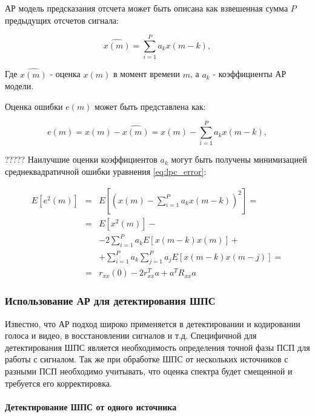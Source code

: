 АР модель предсказания отсчета может быть описана как взвешенная сумма ${P}$ предыдущих отсчетов сигнала:
\begin{center}
\begin{equation}
	\label{eq:lpc_forecast}
	\hat{x(m)} = \sum \limits_{i=1}^P a_k x(m-k),
\end{equation}
\end{center}
Где ${\hat{x(m)}}$ - оценка ${x(m)}$ в момент времени ${m}$, а ${a_k}$ - коэффициенты АР модели.

Оценка ошибки ${e(m)}$ может быть представлена как:
\begin{center}
\begin{equation}
	\label{eq:lpc_error}
	e(m) = x(m) - \hat{x(m)} = x(m) - \sum \limits_{i=1}^P a_k x(m-k),
\end{equation}
\end{center}

????? Наилучшие оценки коэффициентов ${a_k}$ могут быть получены минимизацией среднеквадратичной ошибки уравнения
\ref{eq:lpc_error}:
\begin{center}
\begin{eqnarray}
	\label{eq:lpc_lms}
		E[e^2(m)]	& = & E[(x(m) - \sum \limits_{i=1}^P a_k x(m-k))^2] =\nonumber \\
				& = & E[x^2(m)] - \nonumber \\
				& &  - 2\sum \limits_{i=1}^P a_k E[x(m-k)x(m)] + \nonumber \\
				& &  + \sum \limits_{i=1}^P a_k \sum \limits_{j=1}^P a_j E[x(m-k)x(m-j)] = \nonumber \\
				& = & r_{xx}(0) - 2r^T_{xx}a + a^T R_{xx}a
\end{eqnarray}
\end{center}

\subsubsection{Использование АР для детектирования ШПС}
Известно, что АР подход широко применяется в детектировании и кодировании голоса и видео, в восстановлении сигналов и т.д.
Специфичной для детектирования ШПС является необходимость определения точной фазы ПСП
для работы с сигналом. Так же при обработке ШПС от нескольких источников с разными ПСП необходимо учитывать, что оценка спектра будет смещенной
и требуется его корректировка.

\paragraph{Детектирование ШПС от одного источника}

